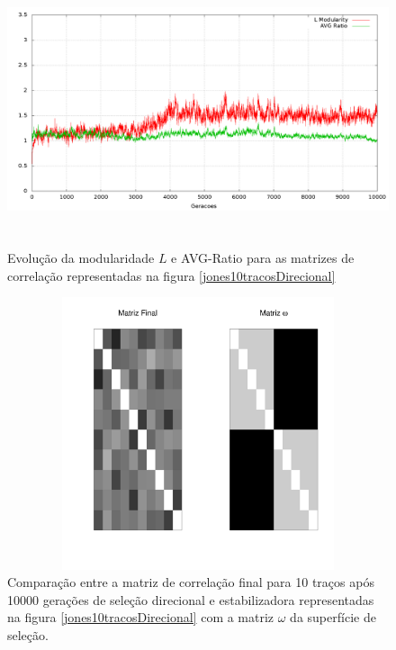 \begin{center}
\begin{figure}[htbp]
  \includegraphics[width=150mm, height=80mm]{figuras/jones10tracosDirecionalStats.png}
  \caption{Evolução da modularidade $L$ e AVG-Ratio para as matrizes de
  correlação representadas na figura \ref{jones10tracosDirecional}}
  \label{jones10tracosDirecionalStats}
\end{figure}
\end{center}

\begin{center}
\begin{figure}[htbp]
  \includegraphics[width=150mm, height=80mm]{figuras/Mat10tracosDirecional}
   \caption{Comparação entre a matriz de correlação final para 10 traços
   após 10000 gerações de seleção direcional e estabilizadora
   representadas na figura \ref{jones10tracosDirecional} com a matriz
   $\omega$ da superfície de seleção.}
  \label{MatJones10tracosDirecional}
\end{figure}
\end{center}

